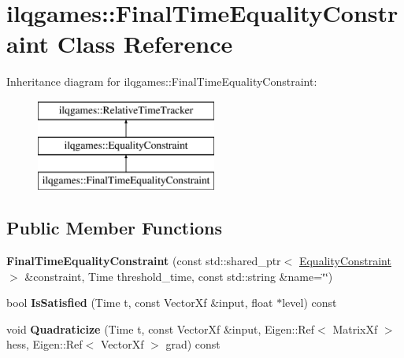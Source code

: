 \hypertarget{classilqgames_1_1_final_time_equality_constraint}{}\section{ilqgames\+:\+:Final\+Time\+Equality\+Constraint Class Reference}
\label{classilqgames_1_1_final_time_equality_constraint}
Inheritance diagram for ilqgames\+:\+:Final\+Time\+Equality\+Constraint\+:\begin{figure}[H]
\begin{center}
\leavevmode
\includegraphics[height=3.000000cm]{classilqgames_1_1_final_time_equality_constraint}
\end{center}
\end{figure}
\subsection*{Public Member Functions}
\begin{DoxyCompactItemize}
\item 
{\bfseries Final\+Time\+Equality\+Constraint} (const std\+::shared\+\_\+ptr$<$ \hyperlink{classilqgames_1_1_equality_constraint}{Equality\+Constraint} $>$ \&constraint, Time threshold\+\_\+time, const std\+::string \&name=\char`\"{}\char`\"{})\hypertarget{classilqgames_1_1_final_time_equality_constraint_af99d6263ee87b83b07547810a3d6d9f9}{}\label{classilqgames_1_1_final_time_equality_constraint_af99d6263ee87b83b07547810a3d6d9f9}

\item 
bool {\bfseries Is\+Satisfied} (Time t, const Vector\+Xf \&input, float $\ast$level) const \hypertarget{classilqgames_1_1_final_time_equality_constraint_aaadc9e53e917468fc28ae7b699bbe8af}{}\label{classilqgames_1_1_final_time_equality_constraint_aaadc9e53e917468fc28ae7b699bbe8af}

\item 
void {\bfseries Quadraticize} (Time t, const Vector\+Xf \&input, Eigen\+::\+Ref$<$ Matrix\+Xf $>$ hess, Eigen\+::\+Ref$<$ Vector\+Xf $>$ grad) const \hypertarget{classilqgames_1_1_final_time_equality_constraint_a3e827a44e64ddb1ae7445b567072a00e}{}\label{classilqgames_1_1_final_time_equality_constraint_a3e827a44e64ddb1ae7445b567072a00e}

\end{DoxyCompactItemize}

